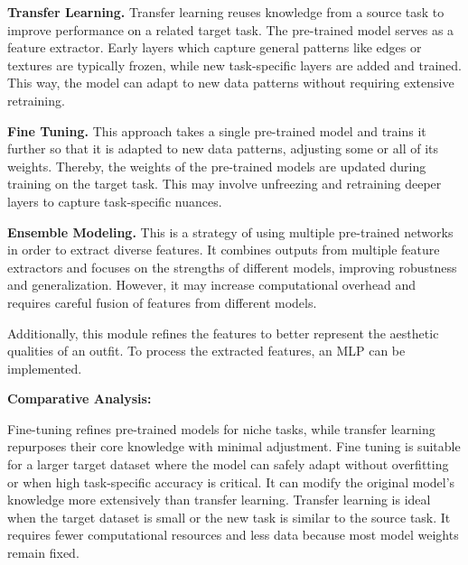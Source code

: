 \vspace{0.5cm}

\textbf{Transfer Learning.}
Transfer learning reuses knowledge from a source task to improve performance on a related target task. The pre-trained model serves as a feature extractor. Early layers which capture general patterns like edges or textures are typically frozen, while new task-specific layers are added and trained. This way, the model can adapt to new data patterns without requiring extensive retraining.

\vspace{0.5cm}

\textbf{Fine Tuning.}
This approach takes a single pre-trained model and trains it further so that it is adapted to new data patterns, adjusting some or all of its weights. Thereby, the weights of the pre-trained models are updated during training on the target task. This may involve unfreezing and retraining deeper layers to capture task-specific nuances.

\vspace{0.5cm}

\textbf{Ensemble Modeling.}
This is a strategy of using multiple pre-trained networks in order to extract diverse features. It combines outputs from multiple feature extractors and focuses on the strengths of different models, improving robustness and generalization. However, it may increase computational overhead and requires careful fusion of features from different models.

Additionally, this module refines the features to better represent the aesthetic qualities of an outfit. To process the extracted features, an \acs{MLP} can be implemented.

\vspace{0.5cm}

\textbf{Comparative Analysis:}

\vspace{0.5cm}

Fine-tuning refines pre-trained models for niche tasks, while transfer learning repurposes their core knowledge with minimal adjustment. Fine tuning is suitable for a larger target dataset where the model can safely adapt without overfitting or when high task-specific accuracy is critical. It can modify the original model's knowledge more extensively than transfer learning. Transfer learning is ideal when the target dataset is small or the new task is similar to the source task. It requires fewer computational resources and less data because most model weights remain fixed.

